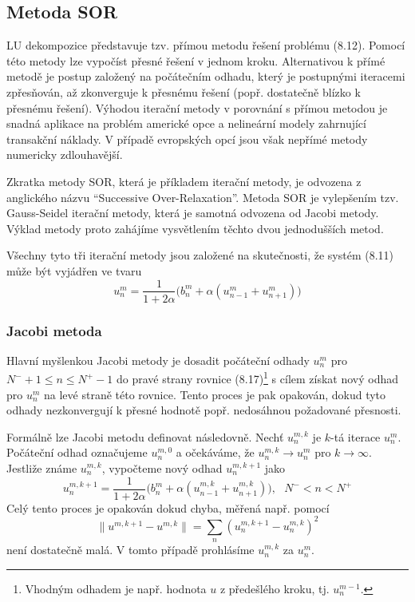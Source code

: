 \documentclass[a4paper]{book}
\begin{document}
\subsection{Metoda SOR}

LU dekompozice představuje tzv. přímou metodu řešení problému (8.12). Pomocí této metody lze vypočíst přesné řešení v jednom kroku. Alternativou k přímé metodě je postup založený na počátečním odhadu, který je postupnými iteracemi zpřesňován, až zkonverguje k přesnému řešení (popř. dostatečně blízko k přesnému řešení). Výhodou iterační metody v porovnání s přímou metodou je snadná aplikace na problém americké opce a nelineární modely zahrnující transakční náklady. V případě evropských opcí jsou však nepřímé metody numericky zdlouhavější.

Zkratka metody SOR, která je příkladem iterační metody, je odvozena z anglického názvu ``Successive Over-Relaxation''. Metoda SOR je vylepšením tzv. Gauss-Seidel iterační metody, která je samotná odvozena od Jacobi metody. Výklad metody proto zahájíme vysvětlením těchto dvou jednodušších metod.

Všechny tyto tři iterační metody jsou založené na skutečnosti, že systém (8.11) může být vyjádřen ve tvaru
\begin{equation}
u_n^m = \frac{1}{1 + 2 \alpha}\Big( b_n^m + \alpha(u_{n-1}^m + u_{n+1}^m) \Big)
\end{equation} 

\subsubsection{Jacobi metoda}

Hlavní myšlenkou Jacobi metody je dosadit počáteční odhady $u_n^m$ pro $N^{-} + 1 \le n \le N^{+} - 1$ do pravé strany rovnice (8.17)\footnote{Vhodným odhadem je např. hodnota $u$ z předešlého kroku, tj. $u_{n}^{m-1}$.} s cílem získat nový odhad pro $u_n^m$ na levé straně této rovnice. Tento proces je pak opakován, dokud tyto odhady nezkonvergují k přesné hodnotě popř. nedosáhnou požadované přesnosti.

Formálně lze Jacobi metodu definovat následovně. Nechť $u_n^{m,k}$ je $k$-tá iterace $u_n^m$. Počáteční odhad označujeme $u_n^{m,0}$ a očekáváme, že $u_n^{m,k} \rightarrow u_n^m$ pro $k \rightarrow \infty$. Jestliže známe $u_n^{m,k}$, vypočteme nový odhad $u_n^{m, k +1}$ jako
\begin{equation}
u_n^{m,k+1} = \frac{1}{1 + 2 \alpha} \Big( b_n^m + \alpha(u_{n-1}^{m,k} + u_{n+1}^{m,k}) \Big),~~~ N^{-} < n < N^{+}
\end{equation}
Celý tento proces je opakován dokud chyba, měřená např. pomocí
\begin{equation*}
\| u^{m, k+1} - u^{m,k} \| = \underset{n}{\sum} (u_n^{m,k+1} - u_n^{m,k})^2
\end{equation*}
není dostatečně malá. V tomto případě prohlásíme $u_n^{m,k}$ za $u_n^m$.
\end{document}
